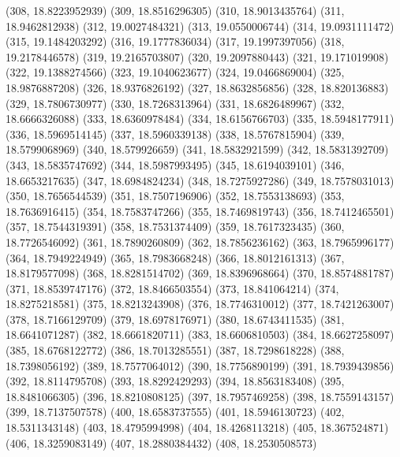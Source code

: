 {					(308, 18.8223952939)
					(309, 18.8516296305)
					(310, 18.9013435764)
					(311, 18.9462812938)
					(312, 19.0027484321)
					(313, 19.0550006744)
					(314, 19.0931111472)
					(315, 19.1484203292)
					(316, 19.1777836034)
					(317, 19.1997397056)
					(318, 19.2178446578)
					(319, 19.2165703807)
					(320, 19.2097880443)
					(321, 19.171019908)
					(322, 19.1388274566)
					(323, 19.1040623677)
					(324, 19.0466869004)
					(325, 18.9876887208)
					(326, 18.9376826192)
					(327, 18.8632856856)
					(328, 18.820136883)
					(329, 18.7806730977)
					(330, 18.7268313964)
					(331, 18.6826489967)
					(332, 18.6666326088)
					(333, 18.6360978484)
					(334, 18.6156766703)
					(335, 18.5948177911)
					(336, 18.5969514145)
					(337, 18.5960339138)
					(338, 18.5767815904)
					(339, 18.5799068969)
					(340, 18.579926659)
					(341, 18.5832921599)
					(342, 18.5831392709)
					(343, 18.5835747692)
					(344, 18.5987993495)
					(345, 18.6194039101)
					(346, 18.6653217635)
					(347, 18.6984824234)
					(348, 18.7275927286)
					(349, 18.7578031013)
					(350, 18.7656544539)
					(351, 18.7507196906)
					(352, 18.7553138693)
					(353, 18.7636916415)
					(354, 18.7583747266)
					(355, 18.7469819743)
					(356, 18.7412465501)
					(357, 18.7544319391)
					(358, 18.7531374409)
					(359, 18.7617323435)
					(360, 18.7726546092)
					(361, 18.7890260809)
					(362, 18.7856236162)
					(363, 18.7965996177)
					(364, 18.7949224949)
					(365, 18.7983668248)
					(366, 18.8012161313)
					(367, 18.8179577098)
					(368, 18.8281514702)
					(369, 18.8396968664)
					(370, 18.8574881787)
					(371, 18.8539747176)
					(372, 18.8466503554)
					(373, 18.841064214)
					(374, 18.8275218581)
					(375, 18.8213243908)
					(376, 18.7746310012)
					(377, 18.7421263007)
					(378, 18.7166129709)
					(379, 18.6978176971)
					(380, 18.6743411535)
					(381, 18.6641071287)
					(382, 18.6661820711)
					(383, 18.6606810503)
					(384, 18.6627258097)
					(385, 18.6768122772)
					(386, 18.7013285551)
					(387, 18.7298618228)
					(388, 18.7398056192)
					(389, 18.7577064012)
					(390, 18.7756890199)
					(391, 18.7939439856)
					(392, 18.8114795708)
					(393, 18.8292429293)
					(394, 18.8563183408)
					(395, 18.8481066305)
					(396, 18.8210808125)
					(397, 18.7957469258)
					(398, 18.7559143157)
					(399, 18.7137507578)
					(400, 18.6583737555)
					(401, 18.5946130723)
					(402, 18.5311343148)
					(403, 18.4795994998)
					(404, 18.4268113218)
					(405, 18.367524871)
					(406, 18.3259083149)
					(407, 18.2880384432)
					(408, 18.2530508573)
}
